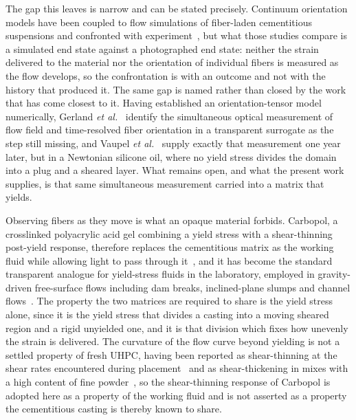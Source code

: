 \documentclass[%
  aip,
  pof,          %
  reprint,      %
  floatfix
]{revtex4-2}
\begin{document}
The gap this leaves is narrow and can be stated precisely. Continuum orientation models have been coupled to flow simulations of fiber-laden cementitious suspensions and confronted with experiment~\cite{svec2012fibre,gudzulic2018computational,martinie2011simple}, but what those studies compare is a simulated end state against a photographed end state: neither the strain delivered to the material nor the orientation of individual fibers is measured as the flow develops, so the confrontation is with an outcome and not with the history that produced it. The same gap is named rather than closed by the work that has come closest to it. Having established an orientation-tensor model numerically, Gerland \textit{et al.}~\cite{gerland2024rheometry} identify the simultaneous optical measurement of flow field and time-resolved fiber orientation in a transparent surrogate as the step still missing, and Vaupel \textit{et al.}~\cite{vaupel2025optical} supply exactly that measurement one year later, but in a Newtonian silicone oil, where no yield stress divides the domain into a plug and a sheared layer. What remains open, and what the present work supplies, is that same simultaneous measurement carried into a matrix that yields.

Observing fibers as they move is what an opaque material forbids. Carbopol, a crosslinked polyacrylic acid gel combining a yield stress with a shear-thinning post-yield response, therefore replaces the cementitious matrix as the working fluid while allowing light to pass through it~\cite{auernhammer2020transparent,piau2007carbopol}, and it has become the standard transparent analogue for yield-stress fluids in the laboratory, employed in gravity-driven free-surface flows including dam breaks, inclined-plane slumps and channel flows~\cite{balmforth2007viscoplastic,freydier2017experimental,poumaere2013unsteady}. The property the two matrices are required to share is the yield stress alone, since it is the yield stress that divides a casting into a moving sheared region and a rigid unyielded one, and it is that division which fixes how unevenly the strain is delivered. The curvature of the flow curve beyond yielding is not a settled property of fresh UHPC, having been reported as shear-thinning at the shear rates encountered during placement~\cite{delarrard1998fresh} and as shear-thickening in mixes with a high content of fine powder~\cite{feys2009shear}, so the shear-thinning response of Carbopol is adopted here as a property of the working fluid and is not asserted as a property the cementitious casting is thereby known to share.
\end{document}
